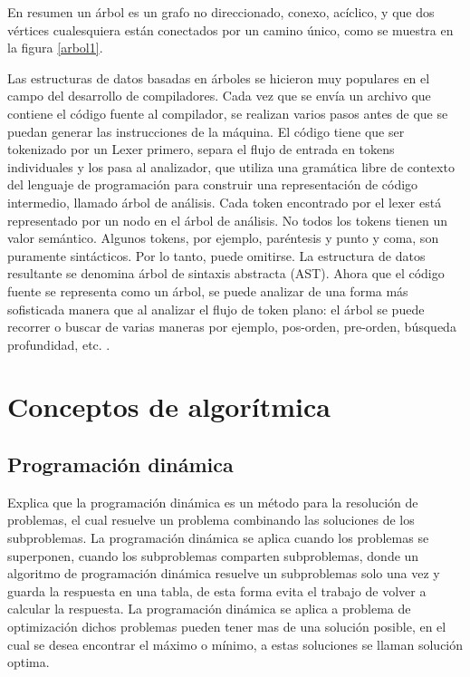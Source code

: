 En resumen un árbol es un grafo no direccionado, conexo, acíclico, y que dos vértices cualesquiera están conectados por un camino único, como se muestra en la figura \ref{arbol1}.

Las estructuras de datos basadas en árboles se hicieron muy populares en el campo del desarrollo de compiladores. Cada vez que se envía un archivo que contiene el código fuente al compilador, se realizan varios pasos antes de que se puedan generar las instrucciones de la máquina. El código tiene que ser tokenizado por un Lexer primero, separa el flujo de entrada en tokens individuales y los pasa al analizador, que utiliza una gramática libre de contexto del lenguaje de programación para construir una representación de código intermedio, llamado árbol de análisis. Cada token encontrado por el lexer está representado por un nodo en el árbol de análisis. No todos los tokens tienen un valor semántico. Algunos tokens, por ejemplo, paréntesis y punto y coma, son puramente sintácticos. Por lo tanto, puede omitirse. La estructura de datos resultante se denomina árbol de sintaxis abstracta (AST). Ahora que el código fuente se representa como un árbol, se puede analizar de una forma más sofisticada manera que al analizar el flujo de token plano: el árbol se puede recorrer o buscar de varias maneras por ejemplo, pos-orden, pre-orden, búsqueda profundidad, etc. \cite{ChangeDistiller}.

\section{Conceptos de algorítmica}

\subsection{Programación dinámica}
\cite{Cormen2009} Explica que la programación dinámica es un método para la resolución de problemas, el cual resuelve un problema combinando las soluciones de los subproblemas. La programación dinámica se aplica cuando los problemas se superponen, cuando los subproblemas comparten subproblemas, donde un algoritmo de programación dinámica resuelve un subproblemas solo una vez y guarda la respuesta en una tabla, de esta forma evita el trabajo de volver a calcular la respuesta. La programación dinámica se aplica a problema de optimización dichos problemas pueden tener mas de una solución posible, en el cual se desea encontrar el máximo o mínimo, a estas soluciones se llaman solución optima.\\

